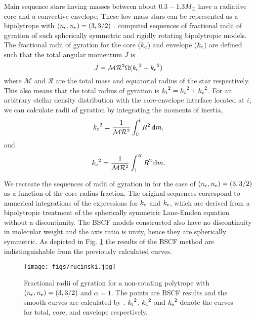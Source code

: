 \documentclass[a4paper,fleqn,usenatbib]{mnras}
\newcommand*\diff{\mathop{}\!\mathrm{d}}
\begin{document}
Main sequence stars having masses between about $ 0.3 - 1.3 M_{\odot}$ have a radiative core and a convective envelope. These low mass stars can be represented as a bipolytrope with $(n_{\rm c},n_{\rm e})=(3,3/2)$ \citep{Rappaport1983, Beech1988a}. 
\cite{Rucinski1988} computed sequences of fractional radii of gyration of such spherically symmetric and rigidly rotating bipolytropic models.
The fractional radii of gyration for the core ($k_{\rm c}$) and envelope ($k_{\rm e}$) are defined such that the total angular momentum $J$ is
 \begin{equation}
 J = \mathcal{M} \mathcal{R}^2 \Omega  ( {k_{\rm c}}^2 + {k_{\rm e}}^2 ) 
 \end{equation} 
where $\mathcal{M}$ and $\mathcal{R}$ are the total mass and equatorial radius of the star respectively. This also means that the total radius of gyration is ${k_{\rm t}}^2={k_{\rm c}}^2+{k_{\rm e}}^2$. For an arbitrary stellar density distribution with the core-envelope interface located at $i$, we can calculate radii of gyration by integrating the moments of inertia,
 \begin{equation}
 {k_{\rm c}}^2 = \frac{1}{\mathcal{M} \mathcal{R}^2} \int_0^{\rm i} R^2 \diff{m},
 \end{equation} 
 and
 \begin{equation}
 {k_{\rm e}}^2 = \frac{1}{\mathcal{M} \mathcal{R}^2} \int_{\rm i}^{\mathcal{R}} R^2 \diff{m}.
 \end{equation} 
 
We recreate the sequences of radii of gyration in \cite{Rucinski1988} for the case of $(n_{\rm c},n_{\rm e})=(3,3/2)$ as a function of the core radius fraction. The original sequences correspond to numerical integrations of the expressions for $k_{\rm c}$ and $k_{\rm e}$, which are derived from a bipolytropic treatment of the spherically symmetric Lane-Emden equation without a discontinuity. 
The BSCF models constructed also have no discontinuity in molecular weight and the axis ratio is unity, hence they are spherically symmetric. As depicted in Fig. \ref{fig:rucinski} the results of the BSCF method are indistinguishable from the previously calculated curves.

\begin{figure}
\centering
\texttt{[image: figs/rucinski.jpg]}
\caption{Fractional radii of gyration for a non-rotating polytrope with $(n_{\rm c},n_{\rm e})=(3,3/2)$ and $\alpha=1$.  
The points are BSCF results and the smooth curves are calculated by 
\protect \cite{Rucinski1988}. 
${k_{\rm t}}^2$, ${k_{\rm c}}^2$ and ${k_{\rm e}}^2$
denote the curves for total, core, and envelope respectively.}  %
\label{fig:rucinski}
\end{figure} 
\end{document}
